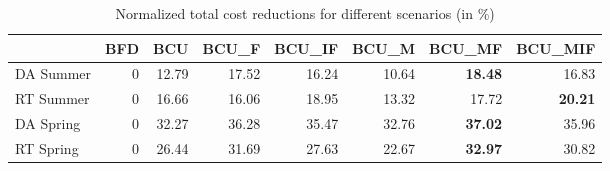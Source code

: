 \begin{table}[ht]
\centering
\begin{tabular}{lrrrrrrr}
\toprule
{} &  BFD &    BCU &  BCU\_F &  BCU\_IF &  BCU\_M &  BCU\_MF &  BCU\_MIF \\
\midrule
DA Summer &    0 &  12.79 &  17.52 &   16.24 &  10.64 &   \textbf{18.48} &    16.83 \\
RT Summer &    0 &  16.66 &  16.06 &   18.95 &  13.32 &   17.72 &    \textbf{20.21} \\
DA Spring &    0 &  32.27 &  36.28 &   35.47 &  32.76 &   \textbf{37.02} &    35.96 \\
RT Spring &    0 &  26.44 &  31.69 &   27.63 &  22.67 &   \textbf{32.97} &    30.82 \\
\bottomrule
\end{tabular}
\caption{Normalized total cost reductions for different scenarios (in \%)}
\end{table}





